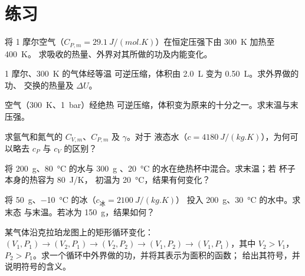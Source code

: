 \section{练习}

\begin{exercise}[$\star$]\label{exo:b1:first-law:1}
将 1 摩尔空气（$C_{P,m} = \qty{29.1}{J/(mol.K)}$）在恒定压强下由
\qty{300}{K} 加热至 \qty{400}{K}。
求吸收的热量、外界对其所做的功及内能变化。
\end{exercise}

\begin{exercise}[$\star$]\label{exo:b1:first-law:2}
1 摩尔、\qty{300}{K} 的气体经等温
可逆压缩，体积由 \qty{2.0}{L} 变为 \qty{0.50}{L}。求外界做的功、
交换的热量及 $\Delta U$。
\end{exercise}

\begin{exercise}[$\star$]\label{exo:b1:first-law:3}
空气（\qty{300}{K}、\qty{1}{bar}）经绝热
可逆压缩，体积变为原来的十分之一。求末温与末压强。
\end{exercise}

\begin{exercise}[$\star$]\label{exo:b1:first-law:4}
求氩气和氮气的 $C_{V,m}$、$C_{P,m}$ 及 $\gamma$。对于
液态水（$c = \qty{4180}{J/(kg.K)}$），为何可以略去
$c_P$ 与 $c_V$ 的区别？
\end{exercise}

\begin{exercise}[$\star\star$]\label{exo:b1:first-law:5}
将 \qty{200}{g}、\qty{80}{\degreeCelsius} 的水与 \qty{300}{g}
、\qty{20}{\degreeCelsius} 的水在绝热杯中混合。求末温；若
杯子本身的热容为 \qty{80}{J/K}，
初温为 \qty{20}{\degreeCelsius}，结果有何变化？
\end{exercise}

\begin{exercise}[$\star\star$]\label{exo:b1:first-law:6}
将 \qty{50}{g}、\qty{-10}{\degreeCelsius} 的冰（$c_{\text{冰}} = \qty{2100}{J/(kg.K)}$）
投入 \qty{200}{g}、\qty{30}{\degreeCelsius} 的水中。求末态
与末温。若冰为 \qty{150}{g}，结果如何？
\end{exercise}

\begin{exercise}[$\star\star$]\label{exo:b1:first-law:7}
某气体沿克拉珀龙图上的矩形循环变化：$(V_1, P_1)
\to (V_2, P_1) \to (V_2, P_2) \to (V_1, P_2) \to (V_1, P_1)$，其中 $V_2 > V_1$，
$P_2 > P_1$。求一个循环中外界做的功，并将其表示为面积的函数；
给出其符号，并说明符号的含义。
\end{exercise}

